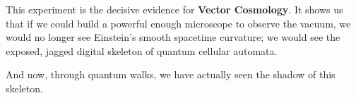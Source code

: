 This experiment is the decisive evidence for \textbf{Vector Cosmology}. It shows us that if we could build a powerful enough microscope to observe the vacuum, we would no longer see Einstein's smooth spacetime curvature; we would see the exposed, jagged digital skeleton of quantum cellular automata.

And now, through quantum walks, we have actually seen the shadow of this skeleton.

